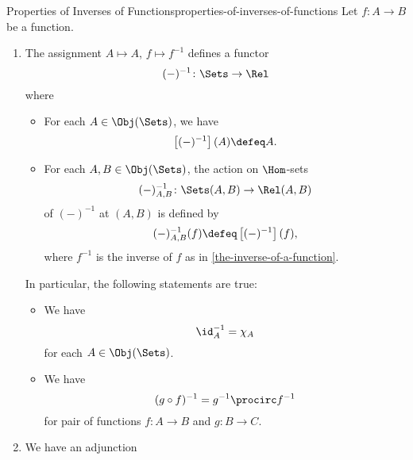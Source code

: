\begin{proposition}{Properties of Inverses of Functions}{properties-of-inverses-of-functions}%
    Let $f\colon A\to B$ be a function.
    \begin{enumerate}
        \item\label{properties-of-inverses-of-functions-functoriality}The assignment $A\mapsto A$, $f\mapsto f^{-1}$ defines a functor
            \[
                (-)^{-1}%
                \colon%
                \Sets%
                \to%
                \Rel%
            \]%
            where
            \begin{itemize}
                \item{}For each $A\in\Obj(\Sets)$, we have
                    \[
                        \left[(-)^{-1}\right](A)%
                        \defeq
                        A.
                    \]%
                \item{}For each $A,B\in\Obj(\Sets)$, the action on $\Hom$-sets
                    \[
                        (-)^{-1}_{A,B}%
                        \colon%
                        \Sets(A,B)
                        \to
                        \Rel(A,B)
                    \]%
                    of $(-)^{-1}$ at $(A,B)$ is defined by
                    \[
                        (-)^{-1}_{A,B}(f)
                        \defeq
                        \left[(-)^{-1}\right](f),
                    \]%
                    where $f^{-1}$ is the inverse of $f$ as in \cref{the-inverse-of-a-function}.
            \end{itemize}
            In particular, the following statements are true:
            \begin{itemize}
                \item{}We have
                    \[
                        \id^{-1}_{A}%
                        =%
                        \chi_{A}%
                    \]%
                    for each $A\in\Obj(\Sets)$.
                \item{}We have
                    \[
                        (g\circ f)^{-1}%
                        =%
                        g^{-1}\procirc f^{-1}
                    \]%
                    for pair of functions $f\colon A\to B$ and $g\colon B\to C$.
            \end{itemize}
        \item\label{properties-of-inverses-of-functions-adjointness-inside-sfbfrel}We have an adjunction

\end{enumerate}
\end{proposition}
